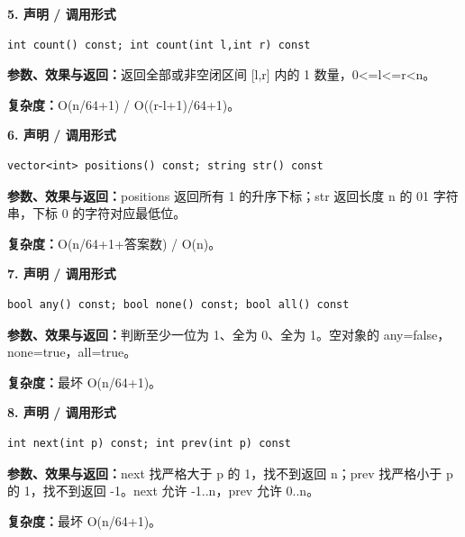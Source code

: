 \documentclass[UTF8,a4paper,10pt]{ctexart}
\begin{document}
\noindent\begin{minipage}{\textwidth}
\textbf{5. 声明 / 调用形式}
\begin{lstlisting}
int count() const; int count(int l,int r) const
\end{lstlisting}
\textbf{参数、效果与返回：}返回全部或非空闭区间 [l,r] 内的 1 数量，0<=l<=r<n。

\textbf{复杂度：}O(n/64+1) / O((r-l+1)/64+1)。

\end{minipage}\par\vspace{0.4em}
\noindent\begin{minipage}{\textwidth}
\textbf{6. 声明 / 调用形式}
\begin{lstlisting}
vector<int> positions() const; string str() const
\end{lstlisting}
\textbf{参数、效果与返回：}positions 返回所有 1 的升序下标；str 返回长度 n 的 01 字符串，下标 0 的字符对应最低位。

\textbf{复杂度：}O(n/64+1+答案数) / O(n)。

\end{minipage}\par\vspace{0.4em}
\noindent\begin{minipage}{\textwidth}
\textbf{7. 声明 / 调用形式}
\begin{lstlisting}
bool any() const; bool none() const; bool all() const
\end{lstlisting}
\textbf{参数、效果与返回：}判断至少一位为 1、全为 0、全为 1。空对象的 any=false，none=true，all=true。

\textbf{复杂度：}最坏 O(n/64+1)。

\end{minipage}\par\vspace{0.4em}
\noindent\begin{minipage}{\textwidth}
\textbf{8. 声明 / 调用形式}
\begin{lstlisting}
int next(int p) const; int prev(int p) const
\end{lstlisting}
\textbf{参数、效果与返回：}next 找严格大于 p 的 1，找不到返回 n；prev 找严格小于 p 的 1，找不到返回 -1。next 允许 -1..n，prev 允许 0..n。

\textbf{复杂度：}最坏 O(n/64+1)。

\end{minipage}\par\vspace{0.4em}
\end{document}
